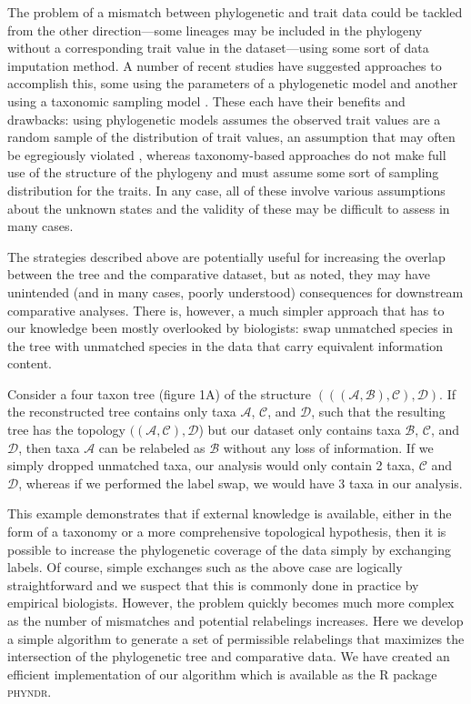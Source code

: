 \documentclass[a4paper,11pt]{article}
\begin{document}
The problem of a mismatch between phylogenetic and trait data could be tackled from the other direction---some lineages may be included in the phylogeny without a corresponding trait value in the dataset---using some sort of data imputation method. A number of recent studies have suggested approaches to accomplish this, some using the parameters of a phylogenetic model \citep{Fagan2013, Swenson2014, PEM} and another using a taxonomic sampling model \citep{FitzJohn2014}. These each have their benefits and drawbacks: using phylogenetic models assumes the observed trait values are a random sample of the distribution of trait values, an assumption that may often be egregiously violated \citep{FitzJohn2014}, whereas taxonomy-based approaches do not make full use of the structure of the phylogeny and must assume some sort of sampling distribution for the traits. In any case, all of these involve various assumptions about the unknown states and the validity of these may be difficult to assess in many cases.

The strategies described above are potentially useful for increasing the overlap between the tree and the comparative dataset, but as noted, they may have unintended (and in many cases, poorly understood) consequences for downstream comparative analyses. There is, however, a much simpler approach that has to our knowledge been mostly overlooked by biologists: swap unmatched species in the tree with unmatched species in the data that carry equivalent information content. 

Consider a four taxon tree (figure 1A) of the structure $(((\mathcal{A},\mathcal{B}),\mathcal{C}),\mathcal{D})$. If the reconstructed tree contains only taxa $\mathcal{A}$, $\mathcal{C}$, and $\mathcal{D}$, such that the resulting tree has the topology $((\mathcal{A},\mathcal{C}),\mathcal{D}$) but our dataset only contains taxa $\mathcal{B}$, $\mathcal{C}$, and $\mathcal{D}$, then taxa $\mathcal{A}$ can be relabeled as  $\mathcal{B}$  without any loss of information. If we simply dropped unmatched taxa, our analysis would only contain 2 taxa, $\mathcal{C}$ and $\mathcal{D}$, whereas if we performed the label swap, we would have 3 taxa in our analysis.

This example demonstrates that if external knowledge is available, either in the form of a taxonomy or a more comprehensive topological hypothesis, then it is possible to increase the phylogenetic coverage of the data simply by exchanging labels. Of course, simple exchanges such as the above case are logically straightforward and we suspect that this is commonly done in practice by empirical biologists. However, the problem quickly becomes much more complex as the number of mismatches and potential relabelings increases. Here we develop a simple algorithm to generate a set of permissible relabelings that maximizes the intersection of the phylogenetic tree and comparative data. We have created an efficient implementation of our algorithm which is available as the R package \textsc{phyndr}. 
\end{document}
